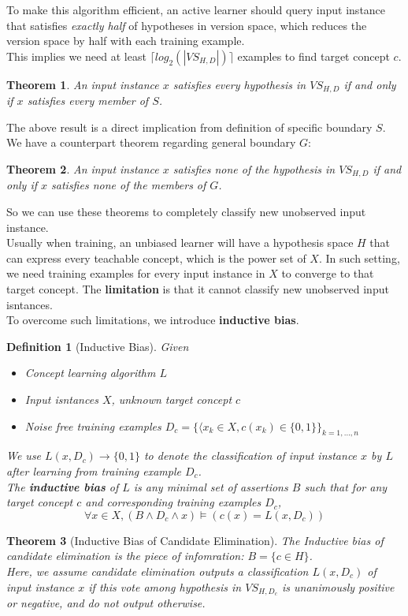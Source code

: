 \documentclass[12pt]{article}
\newtheorem{definition}{Definition}[section]
\newtheorem{theorem}{Theorem}[section]
\theoremstyle{definition}
\begin{document}
To make this algorithm efficient, an active learner should query input instance that satisfies \textit{exactly half} of hypotheses in version space, which reduces the version space by half with each training example.\\
This implies we need at least $\lceil log_2(|VS_{H,D}|)\rceil$ examples to find target concept $c$.
\begin{theorem}\normalfont An input instance $x$ satisfies every hypothesis in $VS_{H,D}$ if and only if $x$ satisfies every member of $S$.
\end{theorem}
The above result is a direct implication from definition of specific boundary $S$.\\
We have a counterpart theorem regarding general boundary $G$:
\begin{theorem}\normalfont An input instance $x$ satisfies none of the hypothesis in $VS_{H,D}$ if and only if $x$ satisfies none of the members of $G$.
\end{theorem}
So we can use these theorems to completely classify new unobserved input instance.\\
Usually when training, an unbiased learner will have a hypothesis space $H$ that can express every teachable concept, which is the power set of $X$. In such setting, we need training examples for every input instance in $X$ to converge to that target concept. The \textbf{limitation} is that it cannot classify new unobserved input isntances.\\
To overcome such limitations, we introduce \textbf{inductive bias}.
\begin{definition}[Inductive Bias]
\normalfont
Given
\begin{itemize}
\item Concept learning algorithm $L$
\item Input isntances $X$, unknown target concept $c$
\item Noise free training examples $D_c=\{\langle x_k\in X, c(x_k)\in \{0,1\}\}_{k=1,\ldots, n}$
\end{itemize}
We use $L(x, D_c)\to \{0,1\}$ to denote the classification of input instance $x$ by $L$ after learning from training example $D_c$.\\
The \textbf{inductive bias} of $L$ is any minimal set of assertions $B$ such that for any target concept $c$ and corresponding training examples $D_c$,
\[
\forall x\in X, (B\land D_c\land x)\models (c(x)=L(x,D_c))
\]
\end{definition}
\begin{theorem}[Inductive Bias of Candidate Elimination]
\normalfont The Inductive bias of candidate elimination is the piece of infomration: $B=\{c\in H\}$.\\
Here, we assume candidate elimination outputs a classification $L(x, D_c)$ of input instance $x$ if this vote among hypothesis in $VS_{H, D_c}$ is unanimously positive or negative, and do not output otherwise.
\end{theorem}
\end{document}
